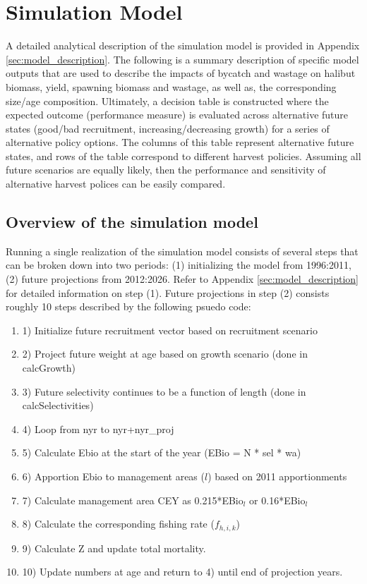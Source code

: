
\section{Simulation Model} %
\label{sec:simulation_model}
A detailed analytical description of the simulation model is provided in Appendix \ref{sec:model_description}.  The following is a summary description of specific model outputs that are used to describe the impacts of bycatch and wastage on halibut biomass, yield, spawning biomass and wastage, as well as, the corresponding size/age composition.  Ultimately, a decision table is constructed where the expected outcome (performance measure) is evaluated across alternative future states (good/bad recruitment, increasing/decreasing growth) for a series of alternative policy options.  The columns of this table represent alternative future states, and rows of the table correspond to different harvest policies. Assuming all future scenarios are equally likely, then the performance and sensitivity of alternative harvest polices can be easily compared.

\subsection{Overview of the simulation model} %
\label{sub:overview_of_the_simulation_model}
 Running a single realization of the simulation model consists of several steps that can be broken down into two periods: (1) initializing the model from 1996:2011, (2) future projections from 2012:2026.  Refer to Appendix \ref{sec:model_description} for detailed information on step (1).  Future projections in step (2) consists roughly 10 steps described by the following psuedo code:
\begin{enumerate}
	\item 	1) Initialize future recruitment vector based on recruitment scenario
	\item	2) Project future weight at age based on growth scenario  (done in calcGrowth)
	\item	3) Future selectivity continues to be a function of length (done in calcSelectivities)
	\item	4) Loop from nyr to nyr+nyr\_proj
	\item	5) Calculate Ebio at the start of the year (EBio = N * sel * wa)
	\item	6) Apportion Ebio to management areas ($l$) based on 2011 apportionments
	\item	7) Calculate management area CEY as 0.215*EBio$_l$ or 0.16*EBio$_l$
	\item	8) Calculate the corresponding fishing rate ($f_{h,i,k}$)
	\item	9) Calculate Z and update total mortality.
	\item	10) Update numbers at age and return to 4) until end of projection years.
\end{enumerate}

